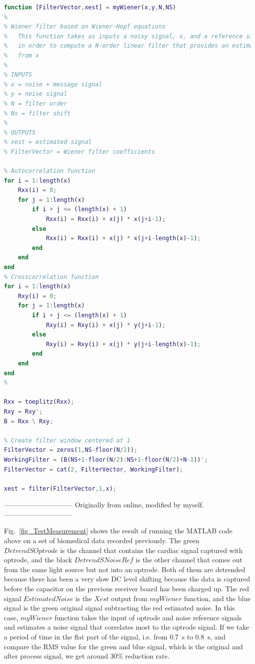 \begin{lstlisting}[language=matlab]
function [FilterVector,xest] = myWiener(x,y,N,NS)
%
% Wiener filter based on Wiener-Hopf equations
%   This function takes as inputs a noisy signal, x, and a reference signal, y,
%   in order to compute a N-order linear filter that provides an estimate of y
%   from x
%  
% INPUTS
% x = noise + message signal
% y = noise signal
% N = filter order
% Ns = filter shift
%
% OUTPUTS
% xest = estimated signal
% FilterVector = Wiener filter coefficients

% Autocorrelation function
for i = 1:length(x)
    Rxx(i) = 0;
    for j = 1:length(x)
        if i + j <= (length(x) + 1)
            Rxx(i) = Rxx(i) + x(j) * x(j+i-1);
        else
            Rxx(i) = Rxx(i) + x(j) * x(j+i-length(x)-1);
        end
    end
end
% Crosscorrelation function
for i = 1:length(x)
    Rxy(i) = 0;
    for j = 1:length(x)
        if i + j <= (length(x) + 1)
            Rxy(i) = Rxy(i) + x(j) * y(j+i-1);
        else
            Rxy(i) = Rxy(i) + x(j) * y(j+i-length(x)-1);
        end
    end
end
%

Rxx = toeplitz(Rxx);
Rxy = Rxy';
B = Rxx \ Rxy;

% Create filter window centered at 1
FilterVector = zeros(1,NS-floor(N/2));
WorkingFilter = (B(NS+1-floor(N/2):NS+1-floor(N/2)+N-1))';
FilterVector = cat(2, FilterVector, WorkingFilter);

xest = filter(FilterVector,1,x);
\end{lstlisting}

------------------------------
Originally from online, modified by myself.
------------------------------

Fig.~\ref{fig_TestMeasurement} shows the result of running the MATLAB code above on a set of biomedical data recorded previously.  The green $Detrend SOptrode$ is the channel that contains the cardiac signal captured with optrode, and the black $ Detrend SNoiseRef$ is the other channel that comes out from the same light source but not into an optrode.  Both of them are detrended because there has been a very slow DC level shifting because the data is captured before the capacitor on the previous receiver board has been charged up.  The red signal $Estimated Noise$ is the $Xest$ output from $myWiener$ function, and the blue signal is the green original signal subtracting the red estimated noise.  In this case, $myWiener$ function takes the input of optrode and noise reference signals and estimates a noise signal that correlates most to the optrode signal.  If we take a period of time in the flat part of the signal, i.e. from \qty{0.7}{s} to \qty{0.8}{s}, and compare the RMS value for the green and blue signal, which is the original and after process signal, we get around 30\% reduction rate.  


